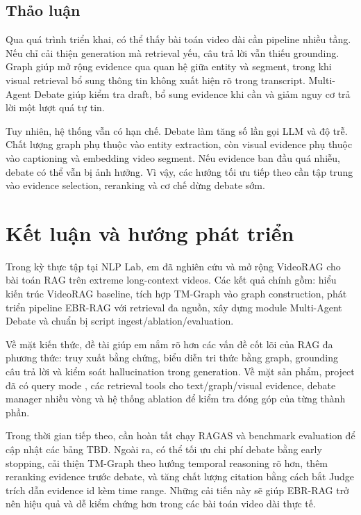 \documentclass[12pt,a4paper]{article}
\newcommand{\codepath}[1]{\path{#1}}
\begin{document}
\subsection{Thảo luận}

Qua quá trình triển khai, có thể thấy bài toán video dài cần pipeline nhiều tầng. Nếu chỉ cải thiện generation mà retrieval yếu, câu trả lời vẫn thiếu grounding. Graph giúp mở rộng evidence qua quan hệ giữa entity và segment, trong khi visual retrieval bổ sung thông tin không xuất hiện rõ trong transcript. Multi-Agent Debate giúp kiểm tra draft, bổ sung evidence khi cần và giảm nguy cơ trả lời một lượt quá tự tin.

Tuy nhiên, hệ thống vẫn có hạn chế. Debate làm tăng số lần gọi LLM và độ trễ. Chất lượng graph phụ thuộc vào entity extraction, còn visual evidence phụ thuộc vào captioning và embedding video segment. Nếu evidence ban đầu quá nhiễu, debate có thể vẫn bị ảnh hưởng. Vì vậy, các hướng tối ưu tiếp theo cần tập trung vào evidence selection, reranking và cơ chế dừng debate sớm.

\section{Kết luận và hướng phát triển}

Trong kỳ thực tập tại NLP Lab, em đã nghiên cứu và mở rộng VideoRAG cho bài toán RAG trên extreme long-context videos. Các kết quả chính gồm: hiểu kiến trúc VideoRAG baseline, tích hợp TM-Graph vào graph construction, phát triển pipeline EBR-RAG với retrieval đa nguồn, xây dựng module Multi-Agent Debate và chuẩn bị script ingest/ablation/evaluation.

Về mặt kiến thức, đề tài giúp em nắm rõ hơn các vấn đề cốt lõi của RAG đa phương thức: truy xuất bằng chứng, biểu diễn tri thức bằng graph, grounding câu trả lời và kiểm soát hallucination trong generation. Về mặt sản phẩm, project đã có query mode \codepath{EBR_RAG}, các retrieval tools cho text/graph/visual evidence, debate manager nhiều vòng và hệ thống ablation để kiểm tra đóng góp của từng thành phần.

Trong thời gian tiếp theo, cần hoàn tất chạy RAGAS và benchmark evaluation để cập nhật các bảng TBD. Ngoài ra, có thể tối ưu chi phí debate bằng early stopping, cải thiện TM-Graph theo hướng temporal reasoning rõ hơn, thêm reranking evidence trước debate, và tăng chất lượng citation bằng cách bắt Judge trích dẫn evidence id kèm time range. Những cải tiến này sẽ giúp EBR-RAG trở nên hiệu quả và dễ kiểm chứng hơn trong các bài toán video dài thực tế.
\end{document}
